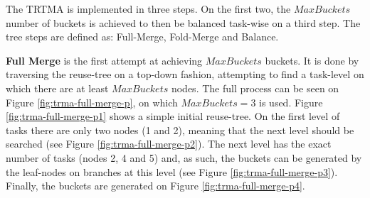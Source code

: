 The TRTMA is implemented in three steps. On the first two, the $MaxBuckets$ number of buckets is achieved to then be balanced task-wise on a third step. The tree steps are defined as: Full-Merge, Fold-Merge and Balance.

\textbf{Full Merge} is the first attempt at achieving $MaxBuckets$ buckets. It is done by traversing the reuse-tree on a top-down fashion, attempting to find a task-level on which there are at least $MaxBuckets$ nodes. The full process can be seen on Figure \ref{fig:trma-full-merge-p}, on which $MaxBuckets=3$ is used. Figure \ref{fig:trma-full-merge-p1} shows a simple initial reuse-tree. On the first level of tasks there are only two nodes (1 and 2), meaning that the next level should be searched (see Figure \ref{fig:trma-full-merge-p2}). The next level has the exact number of tasks (nodes 2, 4 and 5) and, as such, the buckets can be generated by the leaf-nodes on branches at this level (see Figure \ref{fig:trma-full-merge-p3}). Finally, the buckets are generated on Figure \ref{fig:trma-full-merge-p4}.


